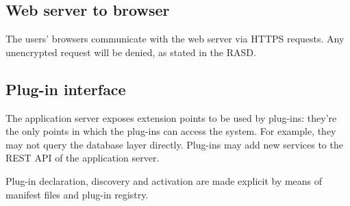 \subsection{Web server to browser}
The users' browsers communicate with the web server via HTTPS requests. Any unencrypted request will be denied, as stated in the RASD.

\subsection{Plug-in interface}
The application server exposes extension points to be used by plug-ins: they're the only points in which the plug-ins can access the system. For example, they may not query the database layer directly.
Plug-ins may add new services to the REST API of the application server.

Plug-in declaration, discovery and activation are made explicit by means of manifest files and plug-in registry.
